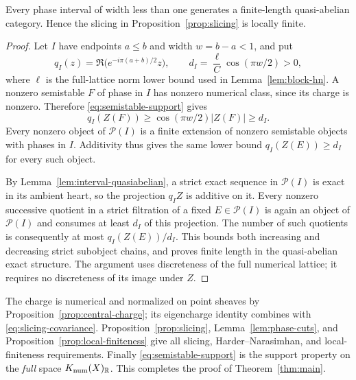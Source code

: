 \begin{proposition}\label{prop:local-finiteness}
Every phase interval of width less than one generates a finite-length
quasi-abelian category.  Hence the slicing in
Proposition~\ref{prop:slicing} is locally finite.
\end{proposition}

\begin{proof}
Let $I$ have endpoints $a\le b$ and width $w=b-a<1$, and put
\[
 q_I(z)=\Re\bigl(e^{-i\pi(a+b)/2}z\bigr),\qquad
 d_I=\frac{\ell}{C}\cos(\pi w/2)>0,
\]
where $\ell$ is the full-lattice norm lower bound used in
Lemma~\ref{lem:block-hn}.  A nonzero semistable $F$ of phase in $I$ has
nonzero numerical class, since its charge is nonzero.  Therefore
\eqref{eq:semistable-support} gives
\[
 q_I(Z(F))\ge\cos(\pi w/2)|Z(F)|\ge d_I.
\]
Every nonzero object of $\mathcal P(I)$ is a finite extension of nonzero
semistable objects with phases in $I$.  Additivity thus gives the same
lower bound $q_I(Z(E))\ge d_I$ for every such object.

By Lemma~\ref{lem:interval-quasiabelian}, a strict exact sequence in
$\mathcal P(I)$ is exact in its ambient heart, so the projection $q_I Z$
is additive on it.  Every nonzero successive quotient in a strict
filtration of a fixed $E\in\mathcal P(I)$ is again an object of
$\mathcal P(I)$ and consumes at least $d_I$ of this projection.
The number of such quotients is consequently at most
$q_I(Z(E))/d_I$.  This bounds both increasing and decreasing strict
subobject chains, and proves finite length in the quasi-abelian exact
structure.  The argument uses discreteness of the full numerical
lattice; it requires no discreteness of its image under $Z$.
\end{proof}

The charge is numerical and normalized on point sheaves by
Proposition~\ref{prop:central-charge}; its eigencharge identity combines
with \eqref{eq:slicing-covariance}.  Proposition~\ref{prop:slicing},
Lemma~\ref{lem:phase-cuts}, and Proposition~\ref{prop:local-finiteness}
give all slicing, Harder--Narasimhan, and local-finiteness requirements.
Finally \eqref{eq:semistable-support} is the support property on the
\emph{full} space $K_{\mathrm{num}}(X)_\mathbb R$.  This completes the proof of
Theorem~\ref{thm:main}.
